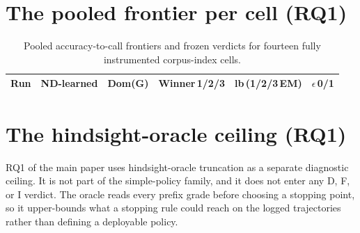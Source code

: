 \documentclass[manuscript,nonacm]{acmart}
\begin{document}

\FloatBarrier
\section{The pooled frontier per cell (RQ1)}
\label{supp:pooled-table}

\begin{table}[!htbp]
\caption{Pooled accuracy-to-call frontiers and frozen verdicts for fourteen
fully instrumented corpus-index cells.}
\label{tab:supp-pooled-frontier}
\scriptsize
\setlength{\tabcolsep}{2.2pt}
\begin{tabular}{llllll}
\toprule
Run & ND-learned & Dom(G) & Winner\,1/2/3 & lb\,(1/2/3\,EM) & $\epsilon$\,0/1 \\
\midrule

\bottomrule
\end{tabular}
\end{table}


\FloatBarrier
\section{The hindsight-oracle ceiling (RQ1)}
\label{supp:oracle}

RQ1 of the main paper uses hindsight-oracle truncation as a separate
diagnostic ceiling. It is not part of the simple-policy family, and it does
not enter any D, F, or I verdict. The oracle reads every prefix grade before
choosing a stopping point, so it upper-bounds what a stopping rule could reach
on the logged trajectories rather than defining a deployable policy.
\end{document}
